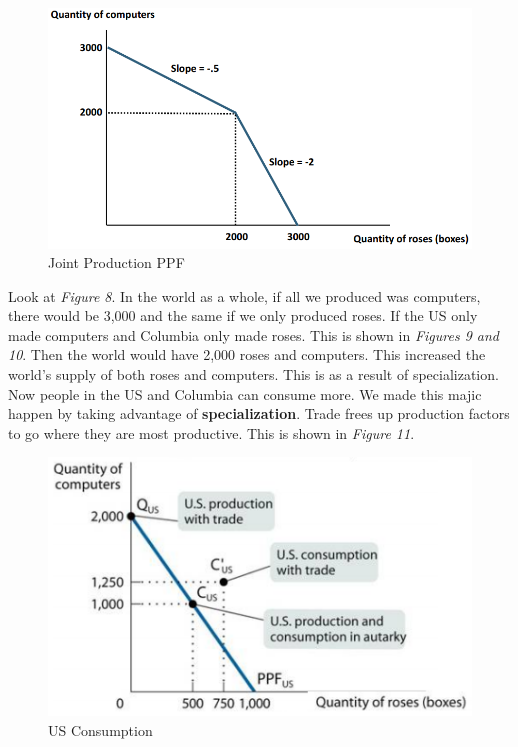 \documentclass{article}
\begin{document}
\begin{figure}[H]
    \centering
    \includegraphics[scale=0.75]{"Figure 4"}
    \caption{Joint Production PPF}
\end{figure}

Look at \textit{Figure 8}. In the world as a whole, if all we produced was
computers, there would be 3,000 and the same if we only produced roses. If the
US only made computers and Columbia only made roses. This is shown in
\textit{Figures 9 and 10}. Then the world would have 2,000 roses and computers. This
increased the world's supply of both roses and computers. This is as a result of
specialization. Now people in the US and Columbia can consume more. We made this
majic happen by taking advantage of \textbf{specialization}. Trade frees up
production factors to go where they are most productive. This is shown in
\textit{Figure 11}.

\begin{figure}[H]
    \centering
    \includegraphics[scale=1]{"Figure 5a"}
    \caption{US Consumption}
\end{figure}
\end{document}
